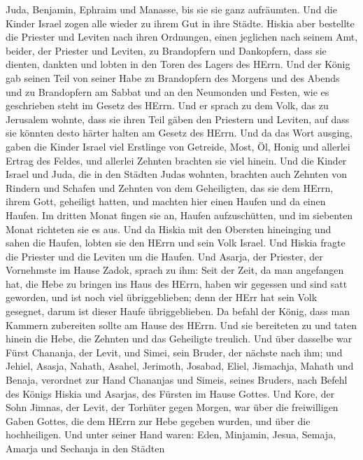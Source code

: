 Juda, Benjamin, Ephraim und Manasse, bis sie sie ganz aufräumten. Und
die Kinder Israel zogen alle wieder zu ihrem Gut in ihre Städte.
 Hiskia aber bestellte die Priester und Leviten nach ihren
Ordnungen, einen jeglichen nach seinem Amt, beider, der Priester und
Leviten, zu Brandopfern und Dankopfern, dass sie dienten, dankten und
lobten in den Toren des Lagers des HErrn.  Und der König gab
seinen Teil von seiner Habe zu Brandopfern des Morgens und des Abends
und zu Brandopfern am Sabbat und an den Neumonden und Festen, wie es
geschrieben steht im Gesetz des HErrn.  Und er sprach zu dem
Volk, das zu Jerusalem wohnte, dass sie ihren Teil gäben den Priestern
und Leviten, auf dass sie könnten desto härter halten am Gesetz des
HErrn.  Und da das Wort ausging, gaben die Kinder Israel
viel Erstlinge von Getreide, Most, Öl, Honig und allerlei Ertrag des
Feldes, und allerlei Zehnten brachten sie viel hinein.  Und
die Kinder Israel und Juda, die in den Städten Judas wohnten, brachten
auch Zehnten von Rindern und Schafen und Zehnten von dem Geheiligten,
das sie dem HErrn, ihrem Gott, geheiligt hatten, und machten hier einen
Haufen und da einen Haufen.  Im dritten Monat fingen sie an,
Haufen aufzuschütten, und im siebenten Monat richteten sie es aus.
 Und da Hiskia mit den Obersten hineinging und sahen die
Haufen, lobten sie den HErrn und sein Volk Israel.  Und
Hiskia fragte die Priester und die Leviten um die Haufen. 
Und Asarja, der Priester, der Vornehmste im Hause Zadok, sprach zu ihm:
Seit der Zeit, da man angefangen hat, die Hebe zu bringen ins Haus des
HErrn, haben wir gegessen und sind satt geworden, und ist noch viel
übriggeblieben; denn der HErr hat sein Volk gesegnet, darum ist dieser
Haufe übriggeblieben.  Da befahl der König, dass man
Kammern zubereiten sollte am Hause des HErrn. Und sie bereiteten zu
 und taten hinein die Hebe, die Zehnten und das Geheiligte
treulich. Und über dasselbe war Fürst Chananja, der Levit, und Simei,
sein Bruder, der nächste nach ihm;  und Jehiel, Asasja,
Nahath, Asahel, Jerimoth, Josabad, Eliel, Jismachja, Mahath und Benaja,
verordnet zur Hand Chananjas und Simeis, seines Bruders, nach Befehl des
Königs Hiskia und Asarjas, des Fürsten im Hause Gottes. 
Und Kore, der Sohn Jimnas, der Levit, der Torhüter gegen Morgen, war
über die freiwilligen Gaben Gottes, die dem HErrn zur Hebe gegeben
wurden, und über die hochheiligen.  Und unter seiner Hand
waren: Eden, Minjamin, Jesua, Semaja, Amarja und Sechanja in den Städten
